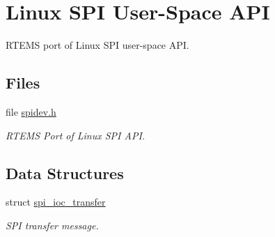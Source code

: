 \hypertarget{group__SPILinux}{}\section{Linux S\+PI User-\/\+Space A\+PI}
\label{group__SPILinux}


R\+T\+E\+MS port of Linux S\+PI user-\/space A\+PI.  


\subsection*{Files}
\begin{DoxyCompactItemize}
\item 
file \mbox{\hyperlink{spidev_8h}{spidev.\+h}}
\begin{DoxyCompactList}\small\item\em R\+T\+E\+MS Port of Linux S\+PI A\+PI. \end{DoxyCompactList}\end{DoxyCompactItemize}
\subsection*{Data Structures}
\begin{DoxyCompactItemize}
\item 
struct \mbox{\hyperlink{structspi__ioc__transfer}{spi\+\_\+ioc\+\_\+transfer}}
\begin{DoxyCompactList}\small\item\em S\+PI transfer message. \end{DoxyCompactList}\end{DoxyCompactItemize}
